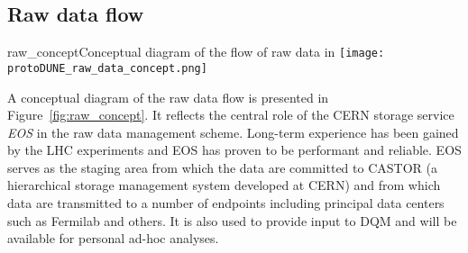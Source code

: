 \subsection{Raw data flow}
\label{sec:raw_concept}

\begin{cdrfigure}{raw_concept}{Conceptual diagram of the flow of raw data in \pdsp} 
\texttt{[image: protoDUNE\_raw\_data\_concept.png]}
\end{cdrfigure}



A conceptual diagram of the raw data flow is presented in
Figure~\ref{fig:raw_concept}.  It reflects the central role of the
CERN storage service \textit{EOS} in the raw data management scheme.
Long-term experience has been gained by the LHC experiments and EOS
has proven to be performant and reliable.  EOS serves as the staging
area from which the data are committed to CASTOR (a hierarchical
storage management system developed at CERN) and from which data are
transmitted to a number of endpoints including principal data centers
such as Fermilab and others.  It is also used to provide input to DQM
and will be available for personal ad-hoc analyses.



